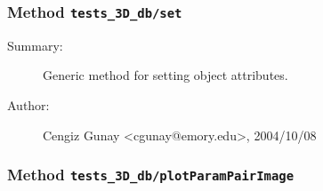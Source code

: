 \subsubsection[Method \texttt{set}]{Method \texttt{tests\_3D\_db/set}}%
%
\label{ref_tests_3D_db__set}%
\hypertarget{ref_tests_3D_db__set}{}%
\begin{description}
\item[Summary:]Generic method for setting object attributes.
%
%
%
%
%
%
%
\item[Author:]%
Cengiz Gunay <cgunay@emory.edu>, 2004/10/08%
\end{description}
\methodline%
\subsubsection[Method \texttt{plotParamPairImage}]{Method \texttt{tests\_3D\_db/plotParamPairImage}}%
%
\label{ref_tests_3D_db__plotParamPairImage}%
\hypertarget{ref_tests_3D_db__plotParamPairImage}{}%
